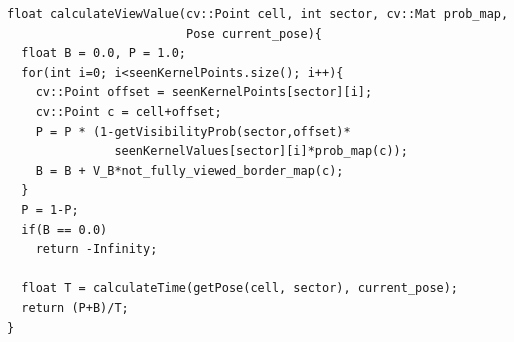 \begin{minipage}{\linewidth}
\begin{lstlisting}[caption=calculateViewValue(),frame=single, label=get2DProbabilityMap]
float calculateViewValue(cv::Point cell, int sector, cv::Mat prob_map, 
                         Pose current_pose){
  float B = 0.0, P = 1.0;
  for(int i=0; i<seenKernelPoints.size(); i++){
    cv::Point offset = seenKernelPoints[sector][i];
    cv::Point c = cell+offset;
    P = P * (1-getVisibilityProb(sector,offset)*
               seenKernelValues[sector][i]*prob_map(c));
    B = B + V_B*not_fully_viewed_border_map(c);
  }
  P = 1-P;
  if(B == 0.0)
    return -Infinity;
    
  float T = calculateTime(getPose(cell, sector), current_pose);  
  return (P+B)/T;
}
\end{lstlisting}
\end{minipage}